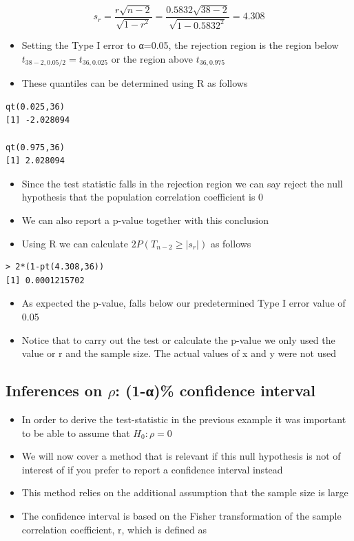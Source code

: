 \documentclass[
]{book}
\providecommand{\tightlist}{%
  \setlength{\itemsep}{0pt}\setlength{\parskip}{0pt}}
\begin{document}
\[s_r=\frac{r\sqrt{n-2}}{\sqrt{1-r^2}}=\frac{0.5832\sqrt{38-2}}{\sqrt{1-0.5832^2}}=4.308\]

\begin{itemize}
\tightlist
\item
  Setting the Type I error to α=0.05, the rejection region is the region below \(t_{38-2,0.05/2} = t_{36,0.025}\) or the region above \(t_{36,0.975}\)
\item
  These quantiles can be determined using R as follows
\end{itemize}

\begin{verbatim}
qt(0.025,36)
[1] -2.028094

qt(0.975,36)
[1] 2.028094
\end{verbatim}

\begin{itemize}
\tightlist
\item
  Since the test statistic falls in the rejection region we can say reject the null hypothesis that the population correlation coefficient is 0
\item
  We can also report a p-value together with this conclusion
\item
  Using R we can calculate \(2P(T_{n-2} ≥ |s_r|)\) as follows
\end{itemize}

\begin{verbatim}
> 2*(1-pt(4.308,36))
[1] 0.0001215702
\end{verbatim}

\begin{itemize}
\tightlist
\item
  As expected the p-value, falls below our predetermined Type I error value of 0.05
\item
  Notice that to carry out the test or calculate the p-value we only used the value or r and the sample size. The actual values of x and y were not used
\end{itemize}

\hypertarget{inferences-on-rho-1-ux3b1-confidence-interval}{%
\subsection{\texorpdfstring{Inferences on \(\rho\): (1-α)\% confidence interval}{Inferences on \textbackslash rho: (1-α)\% confidence interval}}\label{inferences-on-rho-1-ux3b1-confidence-interval}}

\begin{itemize}
\tightlist
\item
  In order to derive the test-statistic in the previous example it was important to be able to assume that \(H_0:\rho=0\)
\item
  We will now cover a method that is relevant if this null hypothesis is not of interest of if you prefer to report a confidence interval instead
\item
  This method relies on the additional assumption that the sample size is large
\item
  The confidence interval is based on the Fisher transformation of the sample correlation coefficient, r, which is defined as
\end{itemize}
\end{document}
